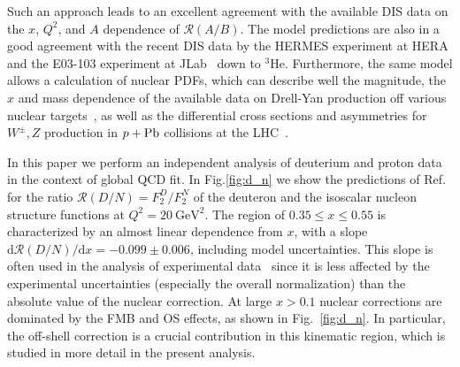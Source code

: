 \documentclass[%
      aps,
      prd,
      floatfix,
      preprintnumbers,
      preprint,
      showpacs,
      nofootinbib,
      tightenlines,
      amssymb,
      amsmath
]{revtex4-1}
\newcommand{\ud}     {\mathrm{d}}
\newcommand{\gevsq}  {\:\mathrm{GeV}^2}
\begin{document}
Such an approach leads to an excellent agreement with the available DIS data on 
the $x$, $Q^2$, and $A$ dependence of $\mathcal R(A/B)$. 
The model predictions are also in a good agreement \cite{KP10} 
with the recent DIS data by the HERMES experiment at HERA \cite{Ackerstaff:1999ac}
and the E03-103 experiment at JLab~\cite{Seely:2009gt} down to ${}^3$He.
Furthermore, the same model allows a calculation of nuclear PDFs, which can describe well the 
magnitude, the $x$ and mass dependence of the available data on Drell-Yan production 
off various nuclear targets~\cite{KP14}, as well as the differential cross sections 
and asymmetries for $W^\pm,Z$ production in $p+{\rm Pb}$ collisions at the LHC~\cite{Ru:2016wfx}.  


In this paper we perform an independent analysis of 
deuterium and proton data in the context of global QCD fit.
In Fig.\ref{fig:d_n} we show the predictions of Ref.~\cite{KP04} for the ratio 
$\mathcal{R}(D/N)=F_2^D/F_2^N$    
of the deuteron and the isoscalar nucleon structure functions at $Q^2=20 \gevsq$.
The region of $0.35 \leq x \leq 0.55$ is characterized by an almost linear dependence from $x$, with a slope  
$\ud {\mathcal R}(D/N) / \ud x = - 0.099\pm 0.006$, including model uncertainties. 
This slope is often used in the analysis 
of experimental data~\cite{Seely:2009gt} since it is less affected by the experimental uncertainties 
(especially the overall normalization) than the absolute value of the nuclear correction.  
% 
At large $x>0.1$ nuclear corrections are dominated by the FMB and OS effects, as shown in Fig.~\ref{fig:d_n}. 
In particular, the off-shell correction is a crucial contribution in this kinematic region, which is 
studied in more detail in the present analysis. 
\end{document}

